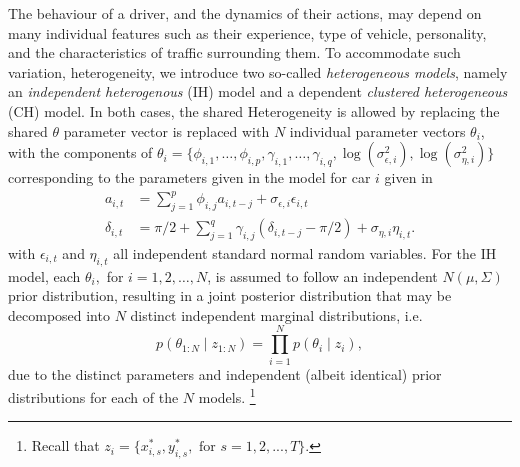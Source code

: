 \documentclass[12pt,a4paper]{article}\usepackage[]{graphicx}\usepackage[]{color}
\begin{document}
The behaviour of a driver, and the dynamics of their actions, may depend on many individual features such as their experience, type of vehicle, personality, and the characteristics of traffic surrounding them. To accommodate such variation, heterogeneity, we introduce two so-called \textit{heterogeneous models}, namely an \textit{independent heterogenous} (IH) model and a dependent \textit{clustered heterogeneous} (CH) model. In both cases, the shared Heterogeneity is allowed by replacing the shared $\theta$ parameter vector is replaced with $N$ individual parameter vectors $\theta_i$, with the components of $\theta_i=\{\phi_{i,1}, \dots, \phi_{i,p}, \gamma_{i,1}, \dots, \gamma_{i,q}, \log(\sigma^{2}_{\epsilon,i}), \log(\sigma^{2}_{\eta,i})\}$ corresponding to the parameters given in the model for car $i$ given in
\begin{align}
a_{i, t} &= \sum_{j = 1}^p \phi_{i, j} a_{i, t-j} + \sigma_{\epsilon, i} \epsilon_{i, t} \label{aAR2} \\
\delta_{i, t} &= \pi/2 + \sum_{j = 1}^q \gamma_{i, j} (\delta_{i, t-j} - \pi/2) + \sigma_{\eta, i} \eta_{i, t}. \label{dAR2}
\end{align}
with $\epsilon_{i,t}$ and $\eta_{i,t}$ all independent standard normal random variables. For the IH model, each $\theta_i,$ for $i=1,2,\ldots, N$, is assumed to follow an independent $N(\mu, \Sigma)$ prior distribution, resulting in a joint posterior distribution that may be decomposed into $N$ distinct independent marginal distributions, i.e.
\begin{equation}
p(\theta_{1:N} \mid z_{1:N}) = \prod_{i=1}^N p(\theta_{i} \mid z_{i}),
\end{equation}
due to the distinct parameters and independent (albeit identical) prior distributions for each of the $N$ models. \footnote{Recall that $z_{i}=\{x^*_{i,s},y^*_{i,s},\mbox{ for } s=1,2,...,T \}$.}
\\
\end{document}
